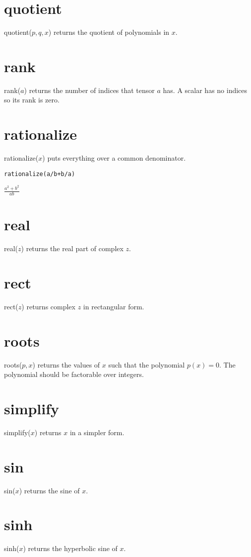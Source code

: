 \section*{quotient}
quotient($p,q,x$) returns the quotient of polynomials in $x$.

\section*{rank}
rank($a$) returns the number of indices that tensor $a$ has.
A scalar has no indices so its rank is zero.

\section*{rationalize}
rationalize($x$) puts everything over a common denominator.

\begin{Verbatim}[formatcom=\color{blue},samepage=true]
rationalize(a/b+b/a)
\end{Verbatim}

$\displaystyle \frac{a^2+b^2}{ab}$

\section*{real}
real($z$) returns the real part of complex $z$.

\section*{rect}
rect($z$) returns complex $z$ in rectangular form.

\section*{roots}
roots($p,x$) returns the values of $x$ such that the polynomial $p(x)=0$.
The polynomial should be factorable over integers.

\section*{simplify}
simplify($x$) returns $x$ in a simpler form.

\section*{sin}
sin($x$) returns the sine of $x$.

\section*{sinh}
sinh($x$) returns the hyperbolic sine of $x$.

